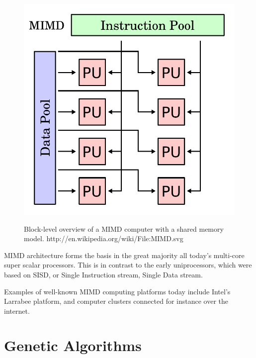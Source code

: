 \begin{figure}[H]
\begin{center}
    \includegraphics[width=\textwidth/2]{fig/mimd-block-diagram.pdf}
    \label{figure:mimd-block-diagram}
    \caption[
    Block-level overview of a MIMD computer with a shared memory model
    ]{
    Block-level overview of a MIMD computer with a shared memory model.
   http://en.wikipedia.org/wiki/File:MIMD.svg 
   }
\end{center}
\end{figure}


MIMD architecture forms the basis in the great majority all today’s multi-core super scalar processors.
This is in contrast to the early uniprocessors, which were based on SISD, or Single Instruction stream, Single Data stream. 


Examples of well-known MIMD computing platforms today include Intel's Larrabee platform, and computer clusters connected for instance over the internet.

\section{Genetic Algorithms}
\label{ga-algorithms}

